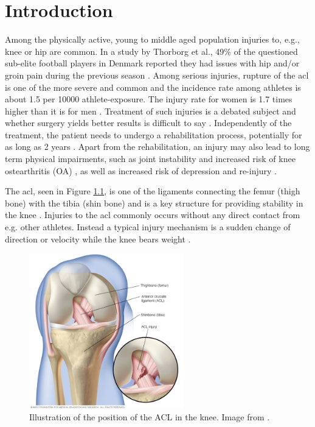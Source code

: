 \chapter{Introduction} \label{ch:intro}
Among the physically active, young to middle aged population injuries to, e.g., knee or hip are common. In a study by Thorborg et al., 49\% of the questioned sub-elite football players in Denmark reported they had issues with hip and/or groin pain during the previous season \cite{Thorborg2017}. Among serious injuries, rupture of the \gls{acl} is one of the more severe and common and the incidence rate among athletes is about 1.5 per 10000 athlete-exposure. The injury rate for women is 1.7 times higher than it is for men \cite{Montalvo2019}. Treatment of such injuries is a debated subject and whether surgery yields better results is difficult to say \cite{Krause2018, Monk2016}. Independently of the treatment, the patient needs to undergo a rehabilitation process, potentially for as long as 2 years \cite{Nagelli2017}.
Apart from the rehabilitation, an injury may also lead to long term physical impairments, such as joint instability \cite{Ageberg2002} and increased risk of knee ostearthritis (OA) \cite{Lohmander2007}, as well as increased risk of depression \cite{Crichlow2006} and re-injury \cite{Paterno2012}.


The \gls{acl}, seen in Figure \ref{fig:acl}, is one of the ligaments connecting the femur (thigh bone) with the tibia (shin bone) and is a key structure for providing stability in the knee \cite{Duthon2006}. Injuries to the \gls{acl} commonly occurs without any direct contact from e.g. other athletes. Instead a typical injury mechanism is a sudden change of direction or velocity while the knee bears weight \cite{Wetters2016}.

\begin{figure}
  \centering
  \includegraphics[width=0.6\textwidth]{files/figs/intro/acl.png}
  \caption{Illustration of the position of the ACL in the knee. Image from \cite{MayoACL}.}
  \label{fig:acl}
\end{figure}

